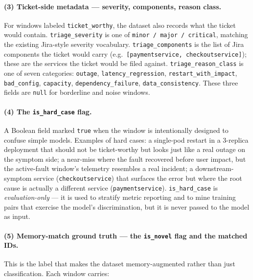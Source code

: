 \paragraph{(3) Ticket-side metadata --- severity, components, reason class.}

For windows labeled \texttt{ticket\_worthy}, the dataset also records what the ticket would contain. \texttt{triage\_severity} is one of \texttt{minor / major / critical}, matching the existing Jira-style severity vocabulary. \texttt{triage\_components} is the list of Jira components the ticket would carry (e.g.\ \texttt{[paymentservice, checkoutservice]}); these are the services the ticket would be filed against. \texttt{triage\_reason\_class} is one of seven categories: \texttt{outage}, \texttt{latency\_regression}, \texttt{restart\_with\_impact}, \texttt{bad\_config}, \texttt{capacity}, \texttt{dependency\_failure}, \texttt{data\_consistency}. These three fields are \texttt{null} for borderline and noise windows.

\paragraph{(4) The \texttt{is\_hard\_case} flag.}

A Boolean field marked \texttt{true} when the window is intentionally designed to confuse simple models. Examples of hard cases: a single-pod restart in a 3-replica deployment that should not be ticket-worthy but looks just like a real outage on the symptom side; a near-miss where the fault recovered before user impact, but the active-fault window's telemetry resembles a real incident; a downstream-symptom service (\texttt{checkoutservice}) that surfaces the error but where the root cause is actually a different service (\texttt{paymentservice}). \texttt{is\_hard\_case} is \emph{evaluation-only} --- it is used to stratify metric reporting and to mine training pairs that exercise the model's discrimination, but it is never passed to the model as input.

\paragraph{(5) Memory-match ground truth --- the \texttt{is\_novel} flag and the matched IDs.}

This is the label that makes the dataset memory-augmented rather than just classification. Each window carries:

